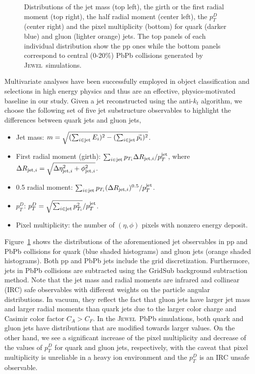 \documentclass[notoc,preprintnumbers]{JHEP3}
\newcommand{\jw}{\textsc{Jewel}~}
\begin{document}
\begin{figure}[h]
	   \caption{Distributions of the jet mass (top left), the girth or the first radial moment (top right), the half radial moment (center left), the $p^{D}_{T}$ (center right) and the pixel multiplicity (bottom) for quark (darker blue) and gluon (lighter orange) jets. The top panels of each individual distribution show the pp ones while the bottom panels correspond to central (0-20\%) PbPb collisions generated by \jw simulations.}
	   \label{fig:jetdistributons_pp_pbpb}
	\end{figure}

Multivariate analyses have been successfully employed in object classification and selections in high energy physics \cite{Bhat:2010zz, 1742-6596-608-1-012058} and thus are an effective, physics-motivated baseline in our study. Given a jet reconstructed using the anti-$k_{t}$ algorithm, we choose the following set of five jet substructure observables \cite{Gallicchio:2012ez} to highlight the differences between quark jets and gluon jets,
	\begin{itemize}
		\item Jet mass: $m = \sqrt{(\sum_{i\in {\rm jet}} E_i)^{2} - (\sum_{i\in {\rm jet}} \vec{p_i})^2}$.
	        \item First radial moment (girth): $\sum_{i \in {\rm jet}} p_{T_i} \Delta R_{{\rm jet}, i}/p^{\rm jet}_{T}$, where $\Delta R_{{\rm jet}, i}=\sqrt{\Delta \eta^2_{{\rm jet}, i}+\phi^2_{{\rm jet}, i}}$.
		\item 0.5 radial moment:  $\sum_{i \in {\rm jet}} p_{T_i} (\Delta R_{{\rm jet}, i})^{0.5}/p^{\rm jet}_{T}$.
        		\item $p_{T}^{D}$: $p^{D}_{T} = \sqrt{\sum_{i \in {\rm jet}} {p^2_{T_i}}}/p^{\rm jet}_{T}$.
       		\item Pixel multiplicity: the number of $(\eta,\phi)$ pixels with nonzero energy deposit.
	\end{itemize}

Figure~\ref{fig:jetdistributons_pp_pbpb} shows the distributions of the aforementioned jet observables in pp and PbPb collisions for quark (blue shaded histograms) and gluon jets (orange shaded histograms). Both pp and PbPb jets include the grid discretization. Furthermore, jets in PbPb collisions are subtracted using the GridSub background subtraction method. Note that the jet mass and radial moments are infrared and collinear (IRC) safe observables with different weights on the particle angular distributions. In vacuum, they reflect the fact that gluon jets have larger jet mass and larger radial moments than quark jets due to the larger color charge and Casimir color factor $C_A>C_F$. In the \jw PbPb simulations, both quark and gluon jets have distributions that are modified towards larger values. On the other hand, we see a significant increase of the pixel multiplicity and decrease of the values of $p_T^D$ for quark and gluon jets, respectively, with the caveat that pixel multiplicity is unreliable in a heavy ion environment and the $p_T^D$ is an IRC unsafe observable. 
\end{document}
